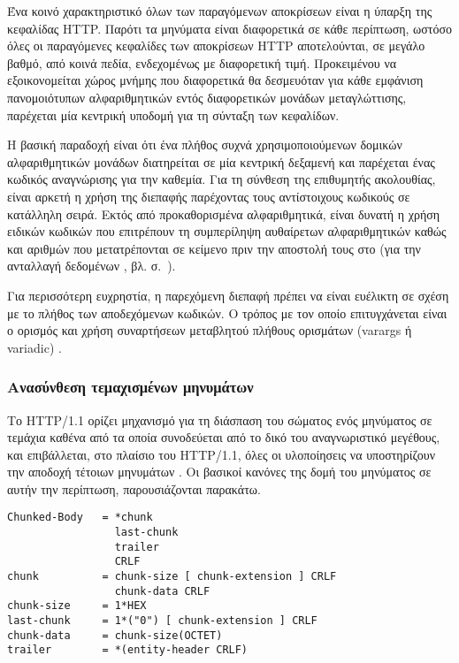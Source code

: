Ένα κοινό χαρακτηριστικό όλων των παραγόμενων αποκρίσεων είναι η ύπαρξη της
κεφαλίδας HTTP. Παρότι τα μηνύματα είναι διαφορετικά σε κάθε περίπτωση, ωστόσο
όλες οι παραγόμενες κεφαλίδες των αποκρίσεων HTTP αποτελούνται, σε μεγάλο βαθμό,
από κοινά πεδία, ενδεχομένως με διαφορετική τιμή. Προκειμένου να εξοικονομείται
χώρος μνήμης που διαφορετικά θα δεσμευόταν για κάθε εμφάνιση πανομοιότυπων
αλφαριθμητικών εντός διαφορετικών μονάδων μεταγλώττισης, παρέχεται μία κεντρική
υποδομή για τη σύνταξη των κεφαλίδων.

Η βασική παραδοχή είναι ότι ένα πλήθος συχνά χρησιμοποιούμενων δομικών
αλφαριθμητικών μονάδων διατηρείται σε μία κεντρική δεξαμενή και παρέχεται ένας
κωδικός αναγνώρισης για την καθεμία. Για τη σύνθεση της επιθυμητής ακολουθίας,
είναι αρκετή η χρήση της διεπαφής παρέχοντας τους αντίστοιχους κωδικούς σε
κατάλληλη σειρά. Εκτός από προκαθορισμένα αλφαριθμητικά, είναι δυνατή η χρήση
ειδικών κωδικών που επιτρέπουν τη συμπερίληψη αυθαίρετων αλφαριθμητικών καθώς
και αριθμών που μετατρέπονται σε κείμενο πριν την αποστολή τους στο 
(για την ανταλλαγή δεδομένων ,
βλ. 
σ.~\pageref{ssubsec:network:rx-tx-buffer}).


Για περισσότερη ευχρηστία, η παρεχόμενη διεπαφή πρέπει να είναι ευέλικτη σε
σχέση με το πλήθος των αποδεχόμενων κωδικών. Ο τρόπος με τον οποίο επιτυγχάνεται
είναι ο ορισμός και χρήση συναρτήσεων μεταβλητού πλήθους ορισμάτων (varargs ή
variadic) \parencite{iso:c99}.


\subsubsection{Ανασύνθεση τεμαχισμένων μηνυμάτων}
\label{ssubsec:network:chunked-input}

Το HTTP/1.1 ορίζει μηχανισμό για τη διάσπαση του σώματος ενός μηνύματος σε
τεμάχια καθένα από τα οποία συνοδεύεται από το δικό του αναγνωριστικό μεγέθους,
και επιβάλλεται, στο πλαίσιο του HTTP/1.1, όλες οι υλοποίησεις να υποστηρίζουν
την αποδοχή τέτοιων μηνυμάτων \parencite[25--26]{rfc2616}. Οι βασικοί κανόνες
της δομή του μηνύματος σε αυτήν την περίπτωση, παρουσιάζονται παρακάτω.

\begin{lstlisting}
Chunked-Body   = *chunk
                 last-chunk
                 trailer
                 CRLF
chunk          = chunk-size [ chunk-extension ] CRLF
                 chunk-data CRLF
chunk-size     = 1*HEX
last-chunk     = 1*("0") [ chunk-extension ] CRLF
chunk-data     = chunk-size(OCTET)
trailer        = *(entity-header CRLF)
\end{lstlisting}

